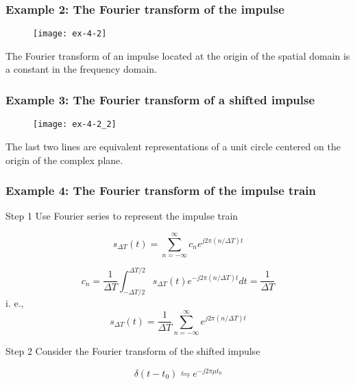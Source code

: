 \begin{frame}
\frametitle{Example 2: The Fourier transform of the impulse}
\begin{figure}
\centering
\texttt{[image: ex-4-2]}
\end{figure}
\begin{block}{}
The Fourier transform of an impulse located at the origin of the spatial domain is a constant in the frequency domain.
\end{block}
\end{frame}


\begin{frame}
\frametitle{Example 3: The Fourier transform of a shifted impulse}
\begin{figure}
\centering
\texttt{[image: ex-4-2\_2]}
\end{figure}
\begin{block}{}
The last two lines are equivalent representations of a unit circle centered on the origin of the complex plane.
\end{block}
\end{frame}


\begin{frame}
\frametitle{Example 4: The Fourier transform of the impulse train}
\begin{block}{Step 1}
Use Fourier series to represent the impulse train
\end{block}
\[
s_{\Delta T}(t) =
\sum_{n=-\infty}^{\infty}
c_{n}
e^{j2\pi(n/\Delta T)t}
\]

\[
c_{n} = \dfrac{1}{\Delta T}
\int_{-\Delta T/2}^{\Delta T/2}
s_{\Delta T}(t)
e^{-j2\pi(n/\Delta T)t}
dt = \dfrac{1}{\Delta T}
\]
i. e.,
\[
\boxed{
s_{\Delta T}(t) = \dfrac{1}{\Delta T}
\sum_{n=-\infty}^{\infty}
e^{j2\pi(n/\Delta T)t}
}
\]
\end{frame}


\begin{frame}
\begin{block}{Step 2}
Consider the Fourier transform of the shifted impulse
\end{block}
\begin{equation}
\delta(t-t_{0}) \leftrightharpoons e^{-j2\pi \mu t_{0}}
\end{equation}
\end{frame}


